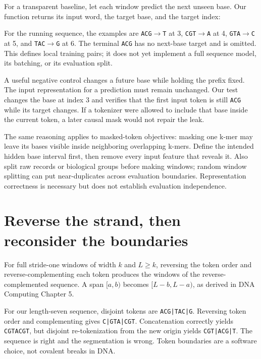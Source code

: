 For a transparent baseline, let each window predict the next unseen base.
Our function returns its input word, the target base, and the target index:

For the running sequence, the examples are
\texttt{ACG}$\to$\texttt{T} at 3,
\texttt{CGT}$\to$\texttt{A} at 4,
\texttt{GTA}$\to$\texttt{C} at 5, and
\texttt{TAC}$\to$\texttt{G} at 6.
The terminal \texttt{ACG} has no next-base target and is omitted.
This defines local training pairs; it does not yet implement a full
sequence model, its batching, or its evaluation split.

A useful negative control changes a future base while holding the prefix
fixed. The input representation for a prediction must remain unchanged.
Our test changes the base at index 3 and verifies that the first input token
is still \texttt{ACG} while its target changes. If a tokenizer were allowed
to include that base inside the current token, a later causal mask would
not repair the leak.

The same reasoning applies to masked-token objectives: masking one k-mer
may leave its bases visible inside neighboring overlapping k-mers. Define
the intended hidden base interval first, then remove every input feature
that reveals it. Also split raw records or biological groups before making
windows; random window splitting can put near-duplicates across evaluation
boundaries. Representation correctness is necessary but does not establish
evaluation independence.

\section{Reverse the strand, then reconsider the boundaries}

For full stride-one windows of width $k$ and $L\geq k$, reversing the token
order and reverse-complementing each token produces the windows of the
reverse-complemented sequence. A span $[a,b)$ becomes $[L-b,L-a)$,
as derived in DNA Computing Chapter 5.


For our length-seven sequence, disjoint tokens are
\texttt{ACG|TAC|G}. Reversing token order and complementing gives
\texttt{C|GTA|CGT}. Concatenation correctly yields \texttt{CGTACGT},
but disjoint re-tokenization from the new origin yields
\texttt{CGT|ACG|T}. The sequence is right and the segmentation is wrong.
Token boundaries are a software choice, not covalent breaks in DNA.

